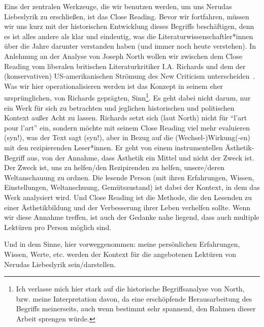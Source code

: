 Eins der zentralen Werkzeuge, die wir benutzen werden, um uns Nerudas Liebeslyrik zu erschließen, ist das Close Reading.
Bevor wir fortfahren, müssen wir uns kurz mit der historischen Entwicklung dieses Begriffs beschäftigen, denn es ist alles andere als klar und eindeutig, was die Literaturwissenschaftler*innen über die Jahre darunter verstanden haben (und immer noch heute verstehen).
In Anlehnung an der Analyse von Joseph North wollen wir zwischen dem Close Reading vom liberalen britischen Literaturkritiker I.A. Richards und dem der (konservativen) US-amerikanischen Strömung des New Criticism unterscheiden~\autocite{North2013}.
Was wir hier operationalisieren werden ist das Konzept in seinem eher ursprünglichen, von Richards geprägten, Sinn\footnote{Ich verlasse mich hier stark auf die historische Begriffsanalyse von North, bzw. meine Interpretation davon, da eine erschöpfende Herausarbeitung des Begriffs meinerseits, auch wenn bestimmt sehr spannend, den Rahmen dieser Arbeit sprengen würde.}.
Es geht dabei nicht darum, nur ein Werk für sich zu betrachten und jeglichen historischen und politischen Kontext außer Acht zu lassen.
Richards setzt sich (laut North) nicht für ``l'art pour l'art'' ein, sondern möchte mit seinem Close Reading viel mehr evaluieren (syn!), was der Text sagt (syn!), aber in Bezug auf die (Wechsel-)Wirkung(-en) mit den rezipierenden Leser*innen.
Er geht von einem instrumentellen Ästhetik-Begriff aus, von der Annahme, dass Ästhetik ein Mittel und nicht der Zweck ist.
Der Zweck ist, uns zu helfen/den Rezipirenden zu helfen, unsere/deren Weltanschauung zu ordnen.
Die lesende Person (mit ihren Erfahrungen, Wissen, Einstellungen, Weltanschuung, Gemütszustand) ist dabei der Kontext, in dem das Werk analysiert wird.
Und Close Reading ist die Methode, die den Lesenden zu einer Ästhetikbildung und der Verbesserung ihrer Leben verhelfen sollte.
Wenn wir diese Annahme treffen, ist auch der Gedanke nahe liegend, dass auch multiple Lektüren pro Person möglich sind.

Und in dem Sinne, hier vorweggenommen: meine persönlichen Erfahrungen, Wissen, Werte, etc. werden der Kontext für die angebotenen Lektüren von Nerudas Liebeslyrik sein/darstellen.

